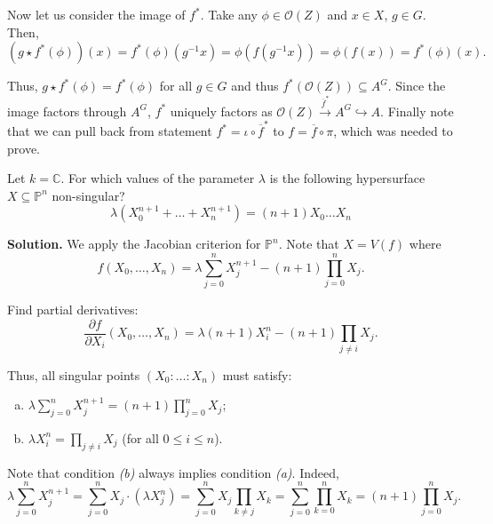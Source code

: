 \documentclass{template}
\begin{document}
Now let us consider the image of $f^*$. Take any $\phi \in \mathcal{O}(Z)$
and $x \in X$, $g \in G$. Then,
\begin{equation*}
    (g \star f^*(\phi))(x) = f^*(\phi)(g^{-1}x) = \phi(f(g^{-1}x)) = \phi(f(x)) = f^*(\phi)(x).
\end{equation*}

Thus, $g \star f^*(\phi) = f^*(\phi)$ for all $g \in G$ and thus
$f^*(\mathcal{O}(Z)) \subseteq A^G$. Since the image factors through $A^G$,
$f^*$ uniquely factors as $\mathcal{O}(Z) \xrightarrow{\overline{f}^*} A^G
\hookrightarrow A$. Finally note that we can pull back from statement $f^* =
\iota \circ \overline{f}^*$ to $f = \overline{f} \circ \pi$, which was 
needed to prove.

\begin{problem}[Exercise 2]
    Let $k=\mathbb{C}$. For which values of the parameter $\lambda$ is the
    following hypersurface $X \subseteq \mathbb{P}^n$ non-singular?
    \begin{equation*}
        \lambda(X_0^{n+1} + \dots + X_n^{n+1}) = (n+1)X_0\dots X_n
    \end{equation*}
\end{problem}

\textbf{Solution.} We apply the Jacobian criterion for $\mathbb{P}^n$. Note that
$X=V(f)$ where 
\begin{equation*}
    f(X_0,\dots,X_n) = \lambda\sum_{j=0}^n X_j^{n+1} - (n+1)\prod_{j=0}^n X_j.
\end{equation*}

Find partial derivatives:
\begin{equation*}
    \frac{\partial f}{\partial X_i}(X_0,\dots,X_n) = \lambda(n+1)X_i^n - (n+1)\prod_{j \neq i}X_j.
\end{equation*}

Thus, all singular points $(X_0: \ldots : X_n)$ must satisfy:
\begin{enumerate}[(a)]
    \item $\lambda\sum_{j=0}^n X_j^{n+1} = (n+1)\prod_{j=0}^n X_j$;
    \item $\lambda X_i^n = \prod_{j \neq i}X_j$ (for all $0 \leq i \leq n$).
\end{enumerate}

Note that condition \textit{(b)} always implies condition \textit{(a)}. Indeed,
\begin{equation*}
    \lambda\sum_{j=0}^n X_j^{n+1} = \sum_{j=0}^n X_j \cdot (\lambda X_j^n) = \sum_{j=0}^n X_j \prod_{k \neq j}X_k = \sum_{j=0}^n \prod_{k=0}^n X_k = (n+1) \prod_{j=0}^n X_j.
\end{equation*}
\end{document}
